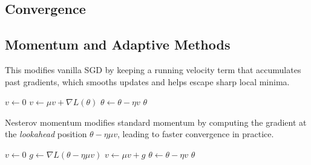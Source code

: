 \subsection{Convergence}



\subsection{Momentum and Adaptive Methods}

  \begin{algo}
    This modifies vanilla SGD by keeping a running velocity term that accumulates past gradients, which smooths updates and helps escape sharp local minima. 
    \begin{algorithm}[H]
    \label{alg:sgd_momentum}
    \begin{algorithmic}[1]  %

        \State $v \gets 0$ 
          \State $v \gets \mu v + \nabla L(\theta)$        
          \State $\theta \gets \theta - \eta v$
        \EndWhile
        \State \Return $\theta$
      \EndProcedure
    \end{algorithmic}
    \end{algorithm}
  \end{algo}

  \begin{algo}
    Nesterov momentum modifies standard momentum by computing the gradient at the \emph{lookahead} position $\theta - \eta \mu v$, leading to faster convergence in practice. 
    \begin{algorithm}[H]
    \label{alg:sgd_nesterov}
    \begin{algorithmic}[1]  %

        \State $v \gets 0$ 
          \State $g \gets \nabla L(\theta - \eta \mu v)$ 
          \State $v \gets \mu v + g$
          \State $\theta \gets \theta - \eta v$
        \EndWhile
        \State \Return $\theta$
      \EndProcedure
    \end{algorithmic}
    \end{algorithm}
  \end{algo}

